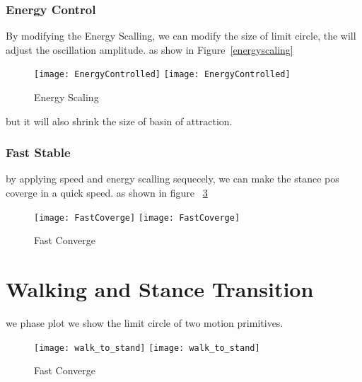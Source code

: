 \subsubsection*{Energy Control}
By modifying the Energy Scalling, we can modify the size of limit circle, the will adjust the oscillation amplitude.
as show in Figure~\ref{energyscaling}
\begin{figure}[!htbp]
  \begin{center}
    \leavevmode
    \ifpdf
      \texttt{[image: EnergyControlled]}
    \else
      \texttt{[image: EnergyControlled]}
    \fi
    \caption{Energy Scaling}
    \label{fig:energyscaling}
\end{center}
\end{figure}


but it will also shrink the size of basin of attraction.




\subsubsection*{Fast Stable}
by applying speed and energy scalling sequecely, we can make the stance pos coverge in a quick speed.
as shown in figure ~\ref{fig:fastconverg}
\begin{figure}[!htbp]
  \begin{center}
    \leavevmode
    \ifpdf
      \texttt{[image: FastCoverge]}
    \else
      \texttt{[image: FastCoverge]}
    \fi
    \caption{Fast Converge}
    \label{fig:fastconverg}
\end{center}
\end{figure}


\section{Walking and Stance Transition}



we phase plot we show the limit circle of two motion primitives.

\begin{figure}[!htbp]
  \begin{center}
    \leavevmode
    \ifpdf
      \texttt{[image: walk\_to\_stand]}
    \else
      \texttt{[image: walk\_to\_stand]}
    \fi
    \caption{Fast Converge}
    \label{fig:fastconverg}
\end{center}
\end{figure}


